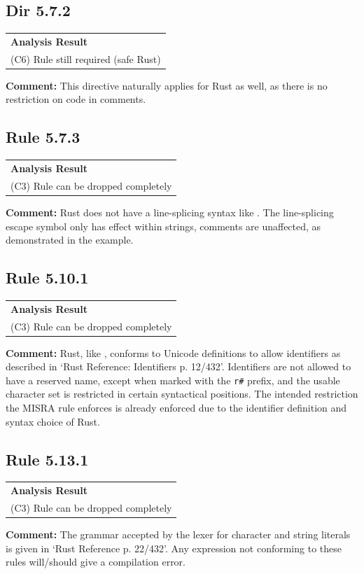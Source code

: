 \subsection*{Dir 5.7.2}
\begin{longtable}{p{13cm}}
\textbf{Analysis Result} \\
(C6) Rule still required (safe Rust) \\
\end{longtable}
\textbf{Comment:} This directive naturally applies for Rust as well, as there is no restriction on code in comments. \\
\subsection*{Rule 5.7.3}
\begin{longtable}{p{13cm}}
\textbf{Analysis Result} \\
(C3) Rule can be dropped completely \\
\end{longtable}
\textbf{Comment:} Rust does not have a line-splicing syntax like \Cpp. The line-splicing\texttt{\\} escape symbol only has effect within strings, comments are unaffected, as demonstrated in the example. \\


\subsection*{Rule 5.10.1}
\begin{longtable}{p{13cm}}
\textbf{Analysis Result} \\
(C3) Rule can be dropped completely \\
\end{longtable}
\textbf{Comment:} Rust, like \Cpp, conforms to Unicode definitions to allow identifiers as described in `Rust Reference: Identifiers p. 12/432'. Identifiers are not allowed to have a reserved name, except when marked with the \texttt{r\#} prefix, and the usable character set is restricted in certain syntactical positions. The intended restriction the MISRA rule enforces is already enforced due to the identifier definition and syntax choice of Rust. \\
\subsection*{Rule 5.13.1}
\begin{longtable}{p{13cm}}
\textbf{Analysis Result} \\
(C3) Rule can be dropped completely \\
\end{longtable}
\textbf{Comment:} The grammar accepted by the lexer for character and string literals is given in `Rust Reference p. 22/432'. Any expression not conforming to these rules will/should give a compilation error. \\


